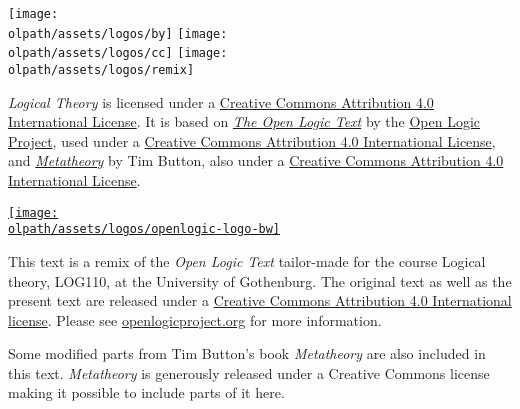 \documentclass[a4paper]{memoir}
\newcommand{\olpath}{../../}
\begin{document}

\begin{titlingpage}

\vfill

\begin{minipage}[b]{.9cm}
\texttt{[image: \\olpath/assets/logos/by]}
\texttt{[image: \\olpath/assets/logos/cc]}
\texttt{[image: \\olpath/assets/logos/remix]}
\end{minipage}
\hspace{.3cm}
\begin{minipage}[b]{6.5cm}
\ollicensefont
\textit{Logical Theory} is licensed under a
\href{http://creativecommons.org/licenses/by/4.0/}{Creative Commons
  Attribution 4.0 International License}. It is based on
\textit{\href{https://github.com/OpenLogicProject/OpenLogic}{The Open
    Logic Text}} by the \href{http://openlogicproject.org/}{Open Logic
  Project}, used under a
\href{http://creativecommons.org/licenses/by/4.0/}{Creative Commons
  Attribution 4.0 International License}, and \textit{\href{http://people.ds.cam.ac.uk/tecb2/metatheory.shtml}{Metatheory}} by Tim Button, also under a \href{http://creativecommons.org/licenses/by/4.0/}{Creative Commons
  Attribution 4.0 International License}.
\end{minipage}
\hfill
\href{http://openlogicproject.org/}{\texttt{[image: \\olpath/assets/logos/openlogic-logo-bw]}}


\end{titlingpage}

\frontmatter
\pagestyle{ruled}

\thispagestyle{empty}%
\noindent This text is a remix of the \textit{Open Logic Text} tailor-made for the course Logical theory, LOG110, at the University of Gothenburg. The original text as well as the present text are released under a \href{http://creativecommons.org/licenses/by/4.0/}{Creative Commons
  Attribution 4.0 International license}. Please see \href{http://openlogicproject.org/}{openlogicproject.org} for
more information.

Some modified parts from Tim Button's book \textit{Metatheory} are also included in this text. \textit{Metatheory} is generously released under a Creative Commons license making it possible to include parts of it here.
\end{document}

